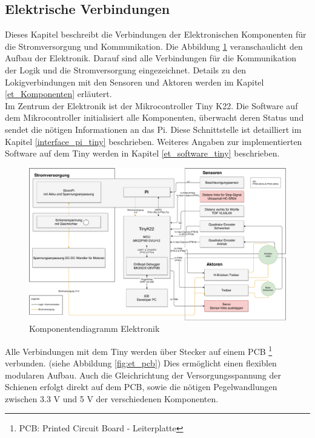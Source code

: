 \documentclass[../../main.tex]{subfiles}
\begin{document}
    \subsection{Elektrische Verbindungen} \label{et_verbindungen}
    Dieses Kapitel beschreibt die Verbindungen der Elektronischen Komponenten für die Stromversorgung und Kommunikation. Die Abbildung \ref{fig:et_komponenten} veranschaulicht den Aufbau der Elektronik. Darauf sind alle Verbindungen für die Kommunikation der Logik und die Stromversorgung eingezeichnet. Details zu den Lokigverbindungen mit den Sensoren und Aktoren werden im Kapitel \ref{et_Komponenten} erläutert. \\
    Im Zentrum der Elektronik ist der Mikrocontroller Tiny K22. Die Software auf dem Mikrocontroller initialisiert alle Komponenten, überwacht deren Status und sendet die nötigen Informationen an das Pi. Diese Schnittstelle ist detailliert im Kapitel \ref{interface_pi_tiny} beschrieben. Weiteres Angaben zur implementierten Software auf dem Tiny werden in Kapitel \ref{et_software_tiny} beschrieben.\\

    \begin{figure}[H]
        \centering
        \includegraphics[width=1.0\textwidth]{../../images/et/KomponentenDiagramm_ET.pdf}
        \caption {Komponentendiagramm Elektronik}
        \label{fig:et_komponenten}
    \end{figure}

    Alle Verbindungen mit dem Tiny werden über Stecker auf einem PCB \footnote{PCB: Printed Circuit Board - Leiterplatte} verbunden. (siehe Abbildung \ref{fig:et_pcb}) Dies ermöglicht einen flexiblen modularen Aufbau. Auch die Gleichrichtung der Versorgungsspannung der Schienen erfolgt direkt auf dem PCB, sowie die nötigen Pegelwandlungen zwischen 3.3 V und 5 V der verschiedenen Komponenten.\\
\end{document}
